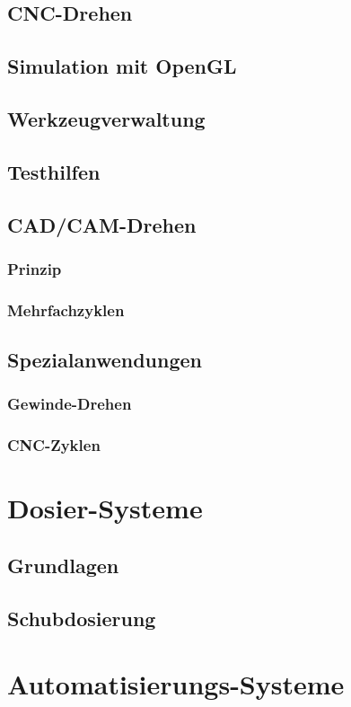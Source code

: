 \documentclass[14pt,a4paper]{book}
\begin{document}
	\section{CNC-Drehen} 
	\section{Simulation mit OpenGL} 
	\section{Werkzeugverwaltung} 
	\section{Testhilfen} 
	\section{CAD/CAM-Drehen} 
		\subsection{Prinzip} 
		\subsection{Mehrfachzyklen} 
	\section{Spezialanwendungen} 
		\subsection{Gewinde-Drehen} 
		\subsection{CNC-Zyklen} 
 
\chapter{Dosier-Systeme}
	\section{Grundlagen} 
	\section{Schubdosierung} 
 
\chapter{Automatisierungs-Systeme}
\end{document}
